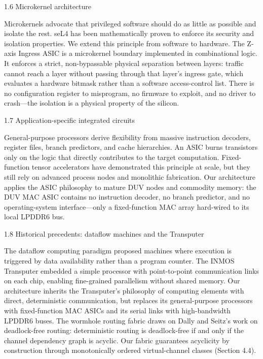 \documentclass[10pt,twocolumn]{article}
\begin{document}
1.6 Microkernel architecture

Microkernels advocate that privileged software should do as little as possible and isolate the rest\cite{8}. seL4 has been mathematically proven to enforce its security and isolation properties\cite{9}. We extend this principle from software to hardware. The Z-axis Ingress ASIC is a microkernel boundary implemented in combinational logic. It enforces a strict, non-bypassable physical separation between layers: traffic cannot reach a layer without passing through that layer's ingress gate, which evaluates a hardware bitmask rather than a software access-control list. There is no configuration register to misprogram, no firmware to exploit, and no driver to crash---the isolation is a physical property of the silicon.

1.7 Application-specific integrated circuits

General-purpose processors derive flexibility from massive instruction decoders, register files, branch predictors, and cache hierarchies. An ASIC burns transistors only on the logic that directly contributes to the target computation. Fixed-function tensor accelerators have demonstrated this principle at scale\cite{10}, but they still rely on advanced process nodes and monolithic fabrication. Our architecture applies the ASIC philosophy to mature DUV nodes and commodity memory: the DUV MAC ASIC contains no instruction decoder, no branch predictor, and no operating-system interface---only a fixed-function MAC array hard-wired to its local LPDDR6 bus.

1.8 Historical precedents: dataflow machines and the Transputer

The dataflow computing paradigm proposed machines where execution is triggered by data availability rather than a program counter\cite{11}. The INMOS Transputer embedded a simple processor with point-to-point communication links on each chip, enabling fine-grained parallelism without shared memory\cite{12}. Our architecture inherits the Transputer's philosophy of computing elements with direct, deterministic communication, but replaces its general-purpose processors with fixed-function MAC ASICs and its serial links with high-bandwidth LPDDR6 buses. The wormhole routing fabric draws on Dally and Seitz's work on deadlock-free routing: deterministic routing is deadlock-free if and only if the channel dependency graph is acyclic\cite{13,14}. Our fabric guarantees acyclicity by construction through monotonically ordered virtual-channel classes (Section 4.4).
\end{document}
